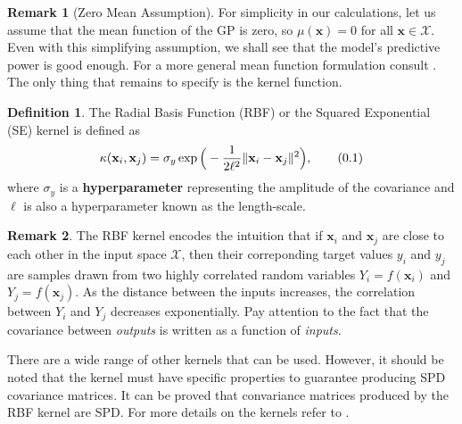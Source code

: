 \documentclass[10pt]{article}
\theoremstyle{definition}
\newtheorem{defn}{Definition}[section]
\newtheorem*{rem}{Remark}
\newcommand\eqnum{\addtocounter{equation}{1}\tag{\arabic{section}.\arabic{equation}}}
\begin{document}
\begin{rem}[Zero Mean Assumption]
For simplicity in our calculations, let us assume that the mean function of the GP is zero, so $\mu(\mathbf{x})=0$ for all $\mathbf{x}\in\mathcal{X}$. Even with this simplifying assumption, we shall see that the model's predictive power is good enough. For a more general mean function formulation consult \cite[Section 2.7]{Rasmussen2006}. The only thing that remains to specify is the kernel function.
\end{rem}
\begin{defn}
The Radial Basis Function (RBF) or the Squared Exponential (SE) kernel is defined as
\begin{equation*}
\kappa(\mathbf{x}_i,\mathbf{x}_j) = \sigma_y \exp \Big(-\frac{1}{2\ell^2} \lVert\mathbf{x}_i-\mathbf{x}_j\rVert^2\Big),
\eqnum
\label{eq:RBF}
\end{equation*}
where $\sigma_y$ is a \textbf{hyperparameter} representing the amplitude of the covariance and $\ell$ is also a hyperparameter known as the length-scale.
\end{defn}
\begin{rem}
The RBF kernel encodes the intuition that if $\mathbf{x}_i$ and $\mathbf{x}_j$ are close to each other in the input space $\mathcal{X}$, then their correponding target values $y_i$ and $y_j$ are samples drawn from two highly correlated random variables $Y_i=f(\mathbf{x}_i)$ and $Y_j=f(\mathbf{x}_j)$. As the distance between the inputs increases, the correlation between $Y_i$ and $Y_j$ decreases exponentially. Pay attention to the fact that the covariance between \textit{outputs} is written as a function of \textit{inputs}.
\end{rem}
There are a wide range of other kernels that can be used. However, it should be noted that the kernel must have specific properties to guarantee producing SPD covariance matrices. It can be proved that convariance matrices produced by the RBF kernel are SPD. For more details on the kernels refer to \cite[Chapter 4]{Rasmussen2006}.
\end{document}
